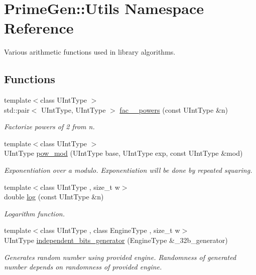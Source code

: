 \hypertarget{namespace_prime_gen_1_1_utils}{\section{Prime\+Gen\+:\+:Utils Namespace Reference}
\label{namespace_prime_gen_1_1_utils}
}


Various arithmetic functions used in library algorithms.  


\subsection*{Functions}
\begin{DoxyCompactItemize}
\item 
{\footnotesize template$<$class U\+Int\+Type $>$ }\\std\+::pair$<$ U\+Int\+Type, U\+Int\+Type $>$ \hyperlink{namespace_prime_gen_1_1_utils_a35a61b9560765cd3e254be8e8f8ad8c1}{fac\+\_\+\_\+powers} (const U\+Int\+Type \&n)
\begin{DoxyCompactList}\small\item\em Factorize powers of 2 from n. \end{DoxyCompactList}\item 
{\footnotesize template$<$class U\+Int\+Type $>$ }\\U\+Int\+Type \hyperlink{namespace_prime_gen_1_1_utils_a640cffdfe9303cbe0eb0205165c3161e}{pow\+\_\+mod} (U\+Int\+Type base, U\+Int\+Type exp, const U\+Int\+Type \&mod)
\begin{DoxyCompactList}\small\item\em Exponentiation over a modulo. Exponentiation will be done by repeated squaring. \end{DoxyCompactList}\item 
{\footnotesize template$<$class U\+Int\+Type , size\+\_\+t w$>$ }\\double \hyperlink{namespace_prime_gen_1_1_utils_ab651d715c25dfed57573d950ee5451c7}{log} (const U\+Int\+Type \&n)
\begin{DoxyCompactList}\small\item\em Logarithm function. \end{DoxyCompactList}\item 
{\footnotesize template$<$class U\+Int\+Type , class Engine\+Type , size\+\_\+t w$>$ }\\U\+Int\+Type \hyperlink{namespace_prime_gen_1_1_utils_a279cd6b89aca43a9597f58aa4a7b5807}{independent\+\_\+bits\+\_\+generator} (Engine\+Type \&\+\_\+32b\+\_\+generator)
\begin{DoxyCompactList}\small\item\em Generates random number using provided engine. Randomness of generated number depends on randomness of provided engine. \end{DoxyCompactList}\end{DoxyCompactItemize}


